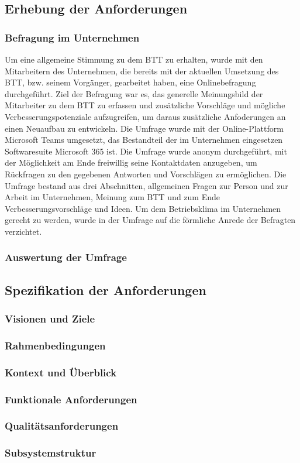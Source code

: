 \subsection{Erhebung der Anforderungen}
\subsubsection{Befragung im Unternehmen}
Um eine allgemeine Stimmung zu dem BTT zu erhalten, wurde mit den Mitarbeitern des Unternehmen, die bereits mit der aktuellen Umsetzung des BTT, bzw. seinem Vorgänger, gearbeitet haben, eine Onlinebefragung durchgeführt. Ziel der Befragung war es, das generelle Meinungsbild der Mitarbeiter zu dem BTT zu erfassen und zusätzliche Vorschläge und mögliche Verbesserungspotenziale aufzugreifen, um daraus zusätzliche Anfoderungen an einen Neuaufbau zu entwickeln. Die Umfrage wurde mit der Online-Plattform \glqq{}Microsoft Teams\grqq{} umgesetzt, das Bestandteil der im Unternehmen eingesetzen Softwaresuite \glqq{}Microsoft 365\grqq{} ist. Die Umfrage wurde anonym durchgeführt, mit der Möglichkeit am Ende freiwillig seine Kontaktdaten anzugeben, um Rückfragen zu den gegebenen Antworten und Vorschlägen zu ermöglichen. Die Umfrage bestand aus drei Abschnitten, allgemeinen Fragen zur Person und zur Arbeit im Unternehmen, Meinung zum BTT und zum Ende Verbesserungsvorschläge und Ideen. Um dem Betriebsklima im Unternehmen gerecht zu werden, wurde in der Umfrage auf die förmliche Anrede der Befragten verzichtet.

\subsubsection{Auswertung der Umfrage}

\subsection{Spezifikation der Anforderungen}
\subsubsection{Visionen und Ziele}

\subsubsection{Rahmenbedingungen}

\subsubsection{Kontext und Überblick}

\subsubsection{Funktionale Anforderungen}

\subsubsection{Qualitätsanforderungen}

\subsubsection{Subsystemstruktur}